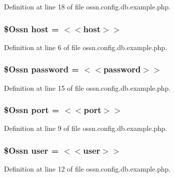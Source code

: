 Definition at line 18 of file ossn.\+config.\+db.\+example.\+php.

\subsubsection[{\texorpdfstring{host}{host}}]{\setlength{\rightskip}{0pt plus 5cm}\$Ossn host = \textquotesingle{}$<$$<$host$>$$>$\textquotesingle{}}\hypertarget{ossn_8config_8db_8example_8php_a5bc8babfba069f855b3288f34a926b5a}{}\label{ossn_8config_8db_8example_8php_a5bc8babfba069f855b3288f34a926b5a}


Definition at line 6 of file ossn.\+config.\+db.\+example.\+php.

\subsubsection[{\texorpdfstring{password}{password}}]{\setlength{\rightskip}{0pt plus 5cm}\$Ossn password = \textquotesingle{}$<$$<$password$>$$>$\textquotesingle{}}\hypertarget{ossn_8config_8db_8example_8php_a278da55536f0d7af0d869c0fb5c4e7c3}{}\label{ossn_8config_8db_8example_8php_a278da55536f0d7af0d869c0fb5c4e7c3}


Definition at line 15 of file ossn.\+config.\+db.\+example.\+php.

\subsubsection[{\texorpdfstring{port}{port}}]{\setlength{\rightskip}{0pt plus 5cm}\$Ossn port = \textquotesingle{}$<$$<$port$>$$>$\textquotesingle{}}\hypertarget{ossn_8config_8db_8example_8php_a6e0ca192d866e7f150aa770832456ae2}{}\label{ossn_8config_8db_8example_8php_a6e0ca192d866e7f150aa770832456ae2}


Definition at line 9 of file ossn.\+config.\+db.\+example.\+php.

\subsubsection[{\texorpdfstring{user}{user}}]{\setlength{\rightskip}{0pt plus 5cm}\$Ossn user = \textquotesingle{}$<$$<$user$>$$>$\textquotesingle{}}\hypertarget{ossn_8config_8db_8example_8php_a802544b7ba9f79bbf24ef67773d53bed}{}\label{ossn_8config_8db_8example_8php_a802544b7ba9f79bbf24ef67773d53bed}


Definition at line 12 of file ossn.\+config.\+db.\+example.\+php.

